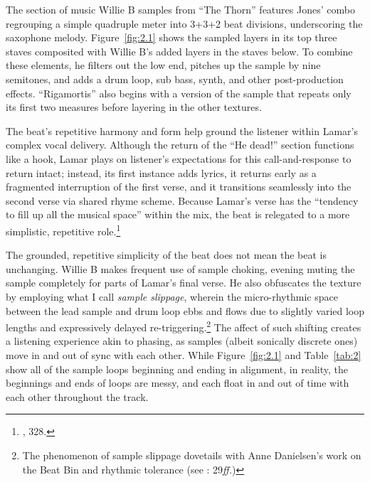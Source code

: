 The section of music Willie B samples from ``The Thorn'' features Jones' combo regrouping a simple quadruple meter into 3+3+2 beat divisions, underscoring the saxophone melody. Figure~\ref{fig:2.1} shows the sampled layers in its top three staves composited with Willie B's added layers in the staves below. To combine these elements, he filters out the low end, pitches up the sample by nine semitones, and adds a drum loop, sub bass, synth, and other post-production effects. ``Rigamortis'' also begins with a version of the sample that repeats only its first two measures before layering in the other textures.

The beat's repetitive harmony and form help ground the listener within Lamar's complex vocal delivery. Although the return of the ``He dead!'' section functions like a hook, Lamar plays on listener's expectations for this call-and-response to return intact; instead, its first instance adds lyrics, it returns early as a fragmented interruption of the first verse, and it transitions seamlessly into the second verse via shared rhyme scheme. Because Lamar's verse has the ``tendency to fill up all the musical space'' within the mix,  the beat is relegated to a more simplistic, repetitive role.\footnote{\cite{ollywilsonHeterogeneousSoundIdeal1992}, 328.}

The grounded, repetitive simplicity of the beat does not mean the beat is unchanging. Willie B makes frequent use of sample choking, evening muting the sample completely for parts of Lamar's final verse. He also obfuscates the texture by employing what I call \emph{sample slippage}, wherein the micro-rhythmic space between the lead sample and drum loop ebbs and flows due to slightly varied loop lengths and expressively delayed re-triggering.\footnote{The phenomenon of sample slippage dovetails with Anne Danielsen's work on the Beat Bin and rhythmic tolerance (see \cite{annedanielsenHereThereEverywhere2016}: 29\textit{ff.})} The affect of such shifting creates a listening experience akin to phasing, as samples (albeit sonically discrete ones) move in and out of sync with each other.  While Figure~\ref{fig:2.1} and Table~{\ref{tab:2}} show all of the sample loops beginning and ending in alignment, in reality, the beginnings and ends of loops are messy, and each float in and out of time with each other throughout the track.

